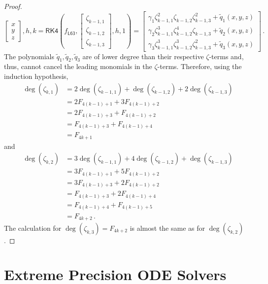 \documentclass{article}
\newcommand{\lb}{\left(} %
\newcommand{\rb}{\right)} %
\newcommand{\br}[1]{\lb #1 \rb} %
\newcommand{\brOf}[1]{\!\br{#1}} %
\newcommand{\eqfs}{\,.}
\begin{document}
\begin{proof}
\begin{equation*}
{\begin{bmatrix}
				x\\
				y\\
				z
			\end{bmatrix}, h, k} = 
		\mathsf{RK4}\brOf{f_{\mathsf{L63}}, \begin{bmatrix}\zeta_{k-1,1}\\\zeta_{k-1,2}\\\zeta_{k-1,3}\end{bmatrix}, h, 1} = 
		\begin{bmatrix}
			\gamma_1 \zeta_{k-1,1}^2\zeta_{k-1,2}\zeta_{k-1,3}^2 + \tilde q_1(x,y,z)\\
			\gamma_2 \zeta_{k-1,1}^3\zeta_{k-1,2}^4\zeta_{k-1,3} + \tilde q_2(x,y,z)\\
			\gamma_3 \zeta_{k-1,1}^3\zeta_{k-1,2}^3\zeta_{k-1,3}^2 + \tilde q_3(x,y,z)
		\end{bmatrix}
		\eqfs
	\end{equation*}
	The polynomials $\tilde q_1, \tilde q_2, \tilde q_3$ are of lower degree than their respective $\zeta$-terms and, thus, cannot cancel the leading monomials in the $\zeta$-terms.
	Therefore, using the induction hypothesis,
	\begin{align*}
		\deg(\zeta_{k,1}) 
		&= 
		2\deg(\zeta_{k-1,1}) + \deg(\zeta_{k-1,2}) + 2 \deg(\zeta_{k-1,3})
		\\&=
		2  F_{4(k-1)+1} + 3  F_{4(k-1)+2}
		\\&=
		2  F_{4(k-1)+3} +  F_{4(k-1)+2}
		\\&=
		F_{4(k-1)+3} +  F_{4(k-1)+4}
		\\&=
		F_{4k+1}
	\end{align*}
	and
	\begin{align*}
		\deg(\zeta_{k,2}) 
		&= 
		3\deg(\zeta_{k-1,1}) + 4\deg(\zeta_{k-1,2}) +  \deg(\zeta_{k-1,3})
		\\&=
		3  F_{4(k-1)+1} + 5 F_{4(k-1)+2}
		\\&=
		3  F_{4(k-1)+3} + 2 F_{4(k-1)+2}
		\\&=
		F_{4(k-1)+3} + 2 F_{4(k-1)+4}
		\\&=
		F_{4(k-1)+4} + F_{4(k-1)+5}
		\\&=
		F_{4k+2}
		\eqfs
	\end{align*}
	The calculation for $\deg(\zeta_{k,3}) = F_{4k+2}$ is almost the same as for $\deg(\zeta_{k,2})$.
\end{proof}
\clearpage
\section{Extreme Precision ODE Solvers}\label{app:sec:xprec}
\end{document}
